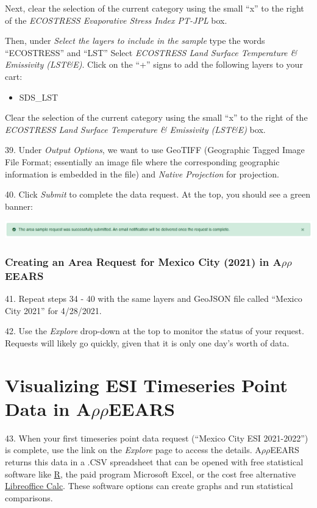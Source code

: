 \documentclass[oneside,a4paper,11pt,explicit]{book}
\begin{document}
Next, clear the selection of the current category using the small ``x'' to the right of the \textit{ECOSTRESS Evaporative Stress Index PT-JPL} box.

Then, under \textit{Select the layers to include in the sample} type the words ``ECOSTRESS'' and ``LST'' Select \textit{ECOSTRESS Land Surface Temperature \& Emissivity (LST\&E)}. Click on the ``+'' signs to add the following layers to your cart: 

\begin{itemize}
	\item SDS\_LST
\end{itemize}

Clear the selection of the current category using the small ``x'' to the right of the \textit{ECOSTRESS Land Surface Temperature \& Emissivity (LST\&E)} box.

39. Under \textit{Output Options}, we want to use GeoTIFF (Geographic Tagged Image File Format; essentially an image file where the corresponding geographic information is embedded in the file) and \textit{Native Projection} for projection.

40. Click \textit{Submit} to complete the data request. At the top, you should see a green banner:

\vspace{.5em}

\centerline{\includegraphics[width=\textwidth]{RequestSuccess.png}}

\subsubsection{Creating an Area Request for Mexico City (2021) in A$\rho\rho$EEARS}

41. Repeat steps 34 - 40 with the same layers and GeoJSON file called ``Mexico City 2021'' for 4/28/2021.

42. Use the \textit{Explore} drop-down at the top to monitor the status of your request. Requests will likely go quickly, given that it is only one day's worth of data.

\section{Visualizing ESI Timeseries Point Data in A$\rho\rho$EEARS}

43. When your first timeseries point data request (``Mexico City ESI 2021-2022'') is complete, use the link on the \textit{Explore} page to access the details. A$\rho\rho$EEARS returns this data in a .CSV spreadsheet that can be opened with free statistical software like \href{https://www.r-project.org/about.html}{R}, the paid program Microsoft Excel, or the cost free alternative \href{https://www.libreoffice.org/}{Libreoffice Calc}. These software options can create graphs and run statistical comparisons. 
\end{document}
